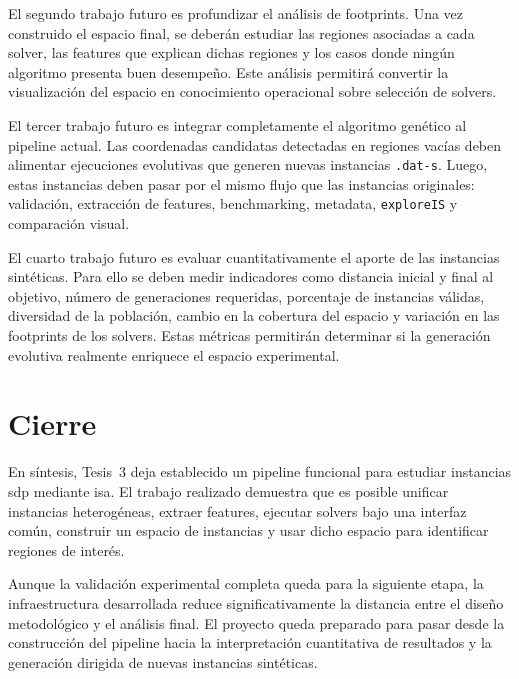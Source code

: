 El segundo trabajo futuro es profundizar el análisis de footprints.
Una vez construido el espacio final, se deberán estudiar las regiones asociadas a cada
solver, las features que explican dichas regiones y los casos donde ningún algoritmo
presenta buen desempeño.
Este análisis permitirá convertir la visualización del espacio en conocimiento
operacional sobre selección de solvers.

El tercer trabajo futuro es integrar completamente el algoritmo genético al pipeline
actual.
Las coordenadas candidatas detectadas en regiones vacías deben alimentar ejecuciones
evolutivas que generen nuevas instancias \texttt{.dat-s}.
Luego, estas instancias deben pasar por el mismo flujo que las instancias originales:
validación, extracción de features, benchmarking, metadata, \texttt{exploreIS} y
comparación visual.

El cuarto trabajo futuro es evaluar cuantitativamente el aporte de las instancias
sintéticas.
Para ello se deben medir indicadores como distancia inicial y final al objetivo,
número de generaciones requeridas, porcentaje de instancias válidas, diversidad de la
población, cambio en la cobertura del espacio y variación en las footprints de los
solvers.
Estas métricas permitirán determinar si la generación evolutiva realmente enriquece el
espacio experimental.


\section{Cierre}
\label{sec:conclusiones_cierre}

En síntesis, Tesis~3 deja establecido un pipeline funcional para estudiar instancias
\acrshort{sdp} mediante \acrshort{isa}.
El trabajo realizado demuestra que es posible unificar instancias heterogéneas,
extraer features, ejecutar solvers bajo una interfaz común, construir un
espacio de instancias y usar dicho espacio para identificar regiones de interés.

Aunque la validación experimental completa queda para la siguiente etapa, la
infraestructura desarrollada reduce significativamente la distancia entre el diseño
metodológico y el análisis final.
El proyecto queda preparado para pasar desde la construcción del pipeline hacia la
interpretación cuantitativa de resultados y la generación dirigida de nuevas
instancias sintéticas.
